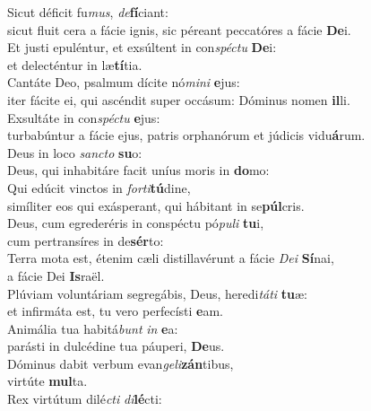 \evenverse Sicut déficit fu\textit{mus}, \textit{de}\textbf{fí}ciant:~\*\\
\evenverse sicut fluit cera a fácie ignis, sic péreant peccatóres a fácie \textbf{De}i.\\
\oddverse Et justi epuléntur, et exsúltent in con\textit{spé}\textit{ctu} \textbf{De}i:~\*\\
\oddverse et delecténtur in læ\textbf{tí}tia.\\
\evenverse Cantáte Deo, psalmum dícite nó\textit{mi}\textit{ni} \textbf{e}jus:~\*\\
\evenverse iter fácite ei, qui ascéndit super occásum: Dóminus nomen \textbf{il}li.\\
\oddverse Exsultáte in con\textit{spé}\textit{ctu} \textbf{e}jus:~\*\\
\oddverse turbabúntur a fácie ejus, patris orphanórum et júdicis vidu\textbf{á}rum.\\
\evenverse Deus in loco \textit{san}\textit{cto} \textbf{su}o:~\*\\
\evenverse Deus, qui inhabitáre facit uníus moris in \textbf{do}mo:\\
\oddverse Qui edúcit vinctos in \textit{for}\textit{ti}\textbf{tú}dine,~\*\\
\oddverse simíliter eos qui exásperant, qui hábitant in se\textbf{púl}cris.\\
\evenverse Deus, cum egrederéris in conspéctu pó\textit{pu}\textit{li} \textbf{tu}i,~\*\\
\evenverse cum pertransíres in de\textbf{sér}to:\\
\oddverse Terra mota est, étenim cæli distillavérunt a fácie \textit{De}\textit{i} \textbf{Sí}nai,~\*\\
\oddverse a fácie Dei \textbf{Is}raël.\\
\evenverse Plúviam voluntáriam segregábis, Deus, heredi\textit{tá}\textit{ti} \textbf{tu}æ:~\*\\
\evenverse et infirmáta est, tu vero perfecísti \textbf{e}am.\\
\oddverse Animália tua habitá\textit{bunt} \textit{in} \textbf{e}a:~\*\\
\oddverse parásti in dulcédine tua páuperi, \textbf{De}us.\\
\evenverse Dóminus dabit verbum evan\textit{ge}\textit{li}\textbf{zán}tibus,~\*\\
\evenverse virtúte \textbf{mul}ta.\\
\oddverse Rex virtútum dilé\textit{cti} \textit{di}\textbf{lé}cti:~\*\\
